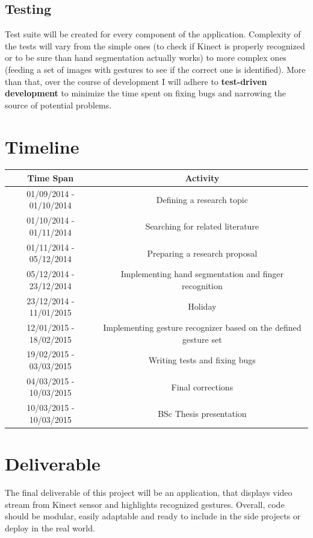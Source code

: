 \documentclass[a4paper,11pt,oneside]{article}
\begin{document}
  \subsection{Testing}
  
  Test suite will be created for every component of the application. Complexity of the tests will vary from the simple ones (to check if Kinect is properly recognized or to be sure than hand segmentation actually works) to more complex ones (feeding a set of images with gestures to see if the correct one is identified). More than that, over the course of development I will adhere to \textbf{test-driven development} to minimize the time spent on fixing bugs and narrowing the source of potential problems.

  \section{Timeline}

  \begin{tabular}{|c|c|}
  \hline
  \textbf{Time Span} & \textbf{Activity} \\ \hline
  01/09/2014 - 01/10/2014 & Defining a research topic \\ \hline
  01/10/2014 - 01/11/2014 & Searching for related literature \\ \hline
  01/11/2014 - 05/12/2014 & Preparing a research proposal \\ \hline
  05/12/2014 - 23/12/2014 & Implementing hand segmentation and finger recognition \\ \hline
  23/12/2014 - 11/01/2015 & Holiday \\ \hline
  12/01/2015 - 18/02/2015 & Implementing gesture recognizer based on the defined gesture set \\ \hline
  19/02/2015 - 03/03/2015 & Writing tests and fixing bugs \\ \hline
  04/03/2015 - 10/03/2015 & Final corrections \\ \hline
  10/03/2015 - 10/03/2015 & BSc Thesis presentation \\ \hline
  \end{tabular}

  \section{Deliverable}
  
  The final deliverable of this project will be an application, that displays video stream from Kinect sensor and highlights recognized gestures. Overall, code should be modular, easily adaptable and ready to include in the side projects or deploy in the real world.
  
\end{document}
